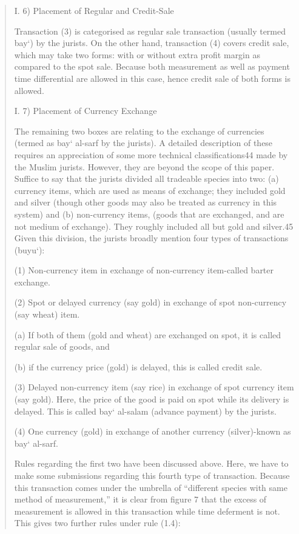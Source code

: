 \begin{quote}
I. 6) Placement of Regular and Credit-Sale

Transaction (3) is categorised as regular sale transaction (usually termed bay‘) by the jurists. On the other hand, transaction (4) covers credit sale, which may take two forms: with or without extra profit margin as compared to the spot sale. Because both measurement as well as payment time differential are allowed in this case, hence credit sale of both forms is allowed.

I. 7) Placement of Currency Exchange

The remaining two boxes are relating to the exchange of currencies (termed as bay‘ al-sarf by the jurists). A detailed description of these requires an appreciation of some more technical classifications44 made by the Muslim jurists. However, they are beyond the scope of this paper. Suffice to say that the jurists divided all tradeable species into two: (a) currency items, which are used as means of exchange; they included gold and silver (though other goods may also be treated as currency in this system) and (b) non-currency items, (goods that are exchanged, and are not medium of exchange). They roughly included all but gold and silver.45 Given this division, the jurists broadly mention four types of transactions (buyu‘):

(1) Non-currency item in exchange of non-currency item-called barter exchange.

(2) Spot or delayed currency (say gold) in exchange of spot non-currency (say wheat) item.

(a) If both of them (gold and wheat) are exchanged on spot, it is called regular sale of goods, and

(b) if the currency price (gold) is delayed, this is called credit sale.

(3) Delayed non-currency item (say rice) in exchange of spot currency item (say gold). Here, the price of the good is paid on spot while its delivery is delayed. This is called bay‘ al-salam (advance payment) by the jurists.

(4) One currency (gold) in exchange of another currency (silver)-known as bay‘ al-sarf.

Rules regarding the first two have been discussed above. Here, we have to make some submissions regarding this fourth type of transaction. Because this transaction comes under the umbrella of “different species with same method of measurement,” it is clear from figure 7 that the excess of measurement is allowed in this transaction while time deferment is not. This gives two further rules under rule (1.4):


\end{quote}
